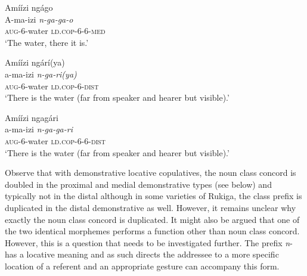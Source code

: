 \documentclass[output=paper 		  ]{langscibook}
\begin{document}
  \ex\label{ex:asiimwe:21b}   Amíízi ngágo\\
  \gll A-ma-izi  \emph{n-ga-ga-o}\\
  \textsc{aug}{}-6-water  \textsc{ld.cop}{}-6-6-\textsc{med}\\
  \glt `The water, there it is.'

  \ex\label{ex:asiimwe:21c}  Amíízi ngárí(ya)\\
 \gll  a-ma-izi  \emph{n-ga-ri(ya)}\\
  \textsc{aug}{}-6-water  \textsc{ld.cop-6-dist}\\
  \glt ‘There is the water (far from speaker and hearer but visible).’

  \ex\label{ex:asiimwe:21d} Amíízi ngagári \\
  \gll a-ma-izi  \emph{n-ga-ga-ri}\\
  \textsc{aug-}6-water  \textsc{ld.cop-6-6-dist}\\
  \glt ‘There is the water (far from speaker and hearer but visible).’
  \z
\z

Observe that with demonstrative locative copulatives, the noun class concord is doubled in the proximal and medial demonstrative types (see  below) and typically not in the distal although in some varieties of Rukiga, the class prefix is duplicated in the distal demonstrative  as well. However, it remains unclear why exactly the noun class concord is duplicated. It might also be argued that one of the two identical morphemes performs a function other than noun class concord. However, this is a question that needs to be investigated further. The prefix \textit{n}{}- has a locative meaning and as such directs the addressee to a more specific location of a referent and an appropriate gesture can accompany this form.
\end{document}
